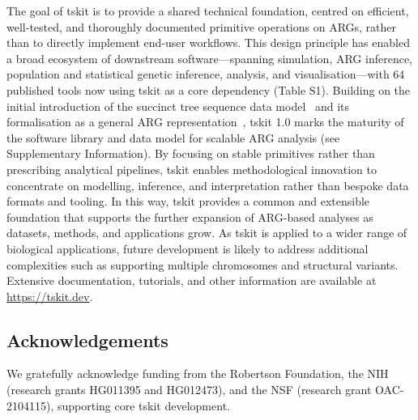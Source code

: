\documentclass{article}
\begin{document}

The goal of tskit is to provide a shared technical foundation, centred on
efficient, well-tested, and thoroughly documented primitive operations on ARGs, rather
than to directly implement end-user workflows.
This design principle has enabled a broad ecosystem of downstream
software---spanning simulation, ARG inference, population and statistical genetic
inference, analysis, and visualisation---with 64 published tools now using tskit
as a core dependency (Table S1).
Building on the initial introduction of the succinct tree sequence
data model~\cite{kelleher2016efficient}
and its formalisation as a general ARG representation~\cite{wong2024general},
tskit 1.0 marks the maturity of the software library and data model
for scalable ARG analysis (see Supplementary Information).
By focusing on stable
primitives rather than prescribing analytical pipelines, tskit enables
methodological innovation to concentrate on modelling, inference, and
interpretation rather than bespoke data formats and tooling.
In this way, tskit provides
a common and extensible foundation that supports the further expansion of
ARG-based analyses as datasets, methods, and applications grow.
As tskit is applied to a wider range of biological applications, future development
is likely to address additional complexities such as supporting multiple
chromosomes and structural variants.
Extensive documentation, tutorials, and other information are available
at \url{https://tskit.dev}.

\subsection*{Acknowledgements}
We gratefully acknowledge funding from the Robertson Foundation,
the NIH (research grants HG011395 and HG012473),
and the NSF (research grant OAC-2104115),
supporting core tskit development.


\end{document}
